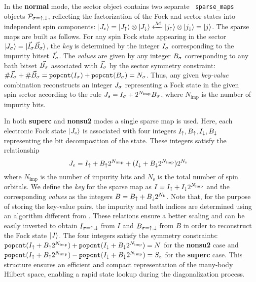 \documentclass[edipack_sp.tex]{subfiles}
\begin{document}
In the {\bf normal} mode, the sector object contains two separate {\tt
  sparse\_maps} objects ${\cal P}_{\sigma=\uparrow,\downarrow}$, reflecting the
factorization of the Fock and sector states into independent spin components: 
$|J_e\rangle=|J_\uparrow\rangle\otimes|J_\downarrow\rangle \xleftarrow{{\cal M}}
|j_\uparrow\rangle\otimes|j_\downarrow\rangle=|j\rangle$.
The sparse maps are built as follows. 
For any spin Fock state appearing in the sector $|J_\sigma\rangle=|{\vec{I}_{\sigma}\vec{B}_{\sigma}}\rangle$,
the \emph{key} is determined by the integer $I_\sigma$ corresponding to the
impurity bitset $\vec{I}_\sigma$. The \emph{values} are given by any
integer $B_\sigma$ corresponding to any bath bitset
$\vec{B_\sigma}$ associated with $\vec{I}_\sigma$ by the sector symmetry constraint: $\#\vec{I}_\sigma + \#\vec{B}_\sigma = \mathtt{popcnt}(I_\sigma) + \mathtt{popcnt}(B_\sigma)= N_\sigma$.
Thus, any given \emph{key-value} combination 
reconstructs an integer $J_\sigma$ representing a Fock state in the
given spin sector according to the rule $J_s = I_\sigma +
2^{N_\mathrm{imp}}B_\sigma$, where $N_\mathrm{imp}$ is the number of impurity bits. 

In both {\bf superc} and {\bf nonsu2} modes a single sparse map is
used.
Here, each electronic Fock state $|J_e\rangle$ is associated with four integers $I_\uparrow, B_\uparrow, I_\downarrow,
B_\downarrow$ representing the bit decomposition of the state. 
These integers satisfy the relationship
\begin{equation}\label{spMapEq1}
J_e =I_\uparrow +  B_\uparrow2^{N_\mathrm{imp}} + (I_\downarrow +  B_\downarrow2^{N_\mathrm{imp}})2^{N_\mathrm{s}}
\end{equation}
where $N_\mathrm{imp}$ is the number of impurity bits and 
$N_\mathrm{s}$ is the total number of spin orbitals.
We define the \emph{key} for the sparse
map as $I=I_\uparrow + I_\downarrow2^{N_\mathrm{imp}}$ and the corresponding
\emph{values} as the integers $B=B_\uparrow + B_\downarrow2^{N_\mathrm{b}}$.
Note that, for the purpose of storing the key-value pairs, the impurity and bath indices are determined using an algorithm different from .   
These relations ensure a better scaling and can be easily inverted to obtain $I_{\sigma=\uparrow,\downarrow}$ from
$I$ and $B_{\sigma=\uparrow,\downarrow}$ from $B$ in order to reconstruct the Fock
state $|J\rangle$.
The four integers satisfy the symmetry constraints:   
$\mathtt{popcnt}(I_\uparrow + B_\uparrow2^{N_\mathrm{imp}}) + \mathtt{popcnt}(I_\downarrow + B_\downarrow2^{N_\mathrm{imp}}) = N$
for the \textbf{nonsu2} case and
$\mathtt{popcnt}(I_\uparrow + B_\uparrow2^{N_\mathrm{imp}}) - \mathtt{popcnt}(I_\downarrow + B_\downarrow2^{N_\mathrm{imp}}) = S_z$
for the \textbf{superc} case.
This structure ensures an efficient and compact representation 
of the many-body Hilbert space, enabling a rapid state lookup 
during the diagonalization process.
\end{document}
